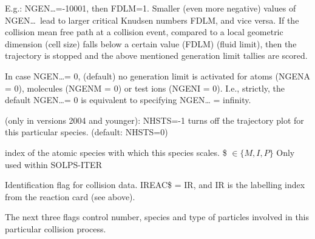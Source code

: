 \begin{description}
\begin{description}
                E.g.:  NGEN\dots=-10001, then FDLM=1.
                Smaller (even more negative) values of NGEN\dots\ lead to larger critical
                Knudsen numbers FDLM, and vice versa.
                If the collision mean free path at a collision event, compared to a local
                geometric dimension (cell size) falls below a certain value (FDLM) (fluid
                limit), then the trajectory is stopped and the above mentioned generation limit
                tallies are scored.
          \item[$= 0$] In case NGEN\dots = 0, (default) no generation limit is activated
                for atoms (NGENA = 0), molecules (NGENM = 0) or test ions (NGENI = 0).
                I.e., strictly, the default NGEN\dots = 0 is equivalent to specifying NGEN\dots
                = infinity.
        \end{description}

  \item[NHSTS\$] (only in versions 2004 and younger): NHSTS=-1 turns off the
        trajectory plot for this particular species.
        (default: NHSTS=0)
  \item[LKIND\$] index of the atomic species with which this species scales.
        {\$} $ \in \{ M, I, P \} $
        Only used within SOLPS-ITER
  \item[IREAC\$] Identification flag
        for collision data.
        IREAC\$ = IR, and IR is the labelling index from the reaction card (see above).
\end{description}
The next three flags control number, species and type of particles involved in
this particular collision process.

